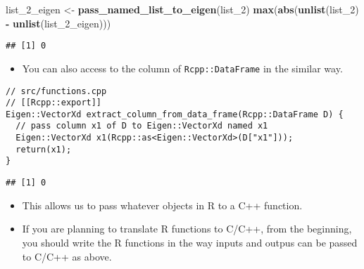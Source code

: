 \documentclass[
]{book}
\newenvironment{Shaded}{\begin{snugshade}}{\end{snugshade}}
\newcommand{\CommentTok}[1]{\textcolor[rgb]{0.56,0.35,0.01}{\textit{#1}}}
\newcommand{\DecValTok}[1]{\textcolor[rgb]{0.00,0.00,0.81}{#1}}
\newcommand{\KeywordTok}[1]{\textcolor[rgb]{0.13,0.29,0.53}{\textbf{#1}}}
\newcommand{\NormalTok}[1]{#1}
\newcommand{\OperatorTok}[1]{\textcolor[rgb]{0.81,0.36,0.00}{\textbf{#1}}}
\newcommand{\StringTok}[1]{\textcolor[rgb]{0.31,0.60,0.02}{#1}}
\providecommand{\tightlist}{%
  \setlength{\itemsep}{0pt}\setlength{\parskip}{0pt}}
\begin{document}
\begin{Shaded}
\begin{Highlighting}[]
\NormalTok{list_}\DecValTok{2}\NormalTok{_eigen <-}\StringTok{ }\KeywordTok{pass_named_list_to_eigen}\NormalTok{(list_}\DecValTok{2}\NormalTok{)}
\KeywordTok{max}\NormalTok{(}\KeywordTok{abs}\NormalTok{(}\KeywordTok{unlist}\NormalTok{(list_}\DecValTok{2}\NormalTok{) }\OperatorTok{-}\StringTok{ }\KeywordTok{unlist}\NormalTok{(list_}\DecValTok{2}\NormalTok{_eigen)))}
\end{Highlighting}
\end{Shaded}

\begin{verbatim}
## [1] 0
\end{verbatim}

\begin{itemize}
\tightlist
\item
  You can also access to the column of \texttt{Rcpp::DataFrame} in the similar way.
\end{itemize}

\begin{verbatim}
// src/functions.cpp
// [[Rcpp::export]]
Eigen::VectorXd extract_column_from_data_frame(Rcpp::DataFrame D) {
  // pass column x1 of D to Eigen::VectorXd named x1
  Eigen::VectorXd x1(Rcpp::as<Eigen::VectorXd>(D["x1"]));
  return(x1);
}
\end{verbatim}

\begin{Shaded}
\end{Shaded}

\begin{verbatim}
## [1] 0
\end{verbatim}

\begin{itemize}
\tightlist
\item
  This allows us to pass whatever objects in R to a C++ function.
\item
  If you are planning to translate R functions to C/C++, from the beginning, you should write the R functions in the way inputs and outpus can be passed to C/C++ as above.
\end{itemize}
\end{document}
